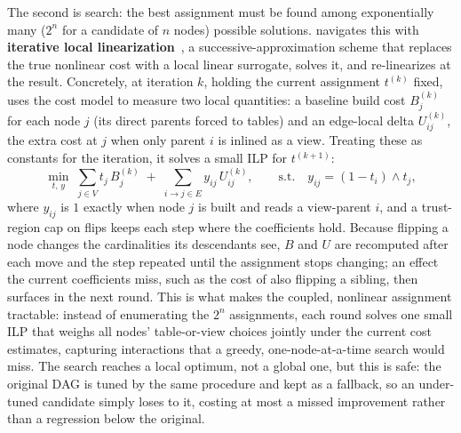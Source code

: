 The second is search: the best assignment must be found among exponentially many ($2^n$ for a candidate of $n$ nodes) possible solutions. \tool{} navigates this with \textbf{iterative local linearization}~\cite{griffith1961slp,palaciosgomez1982slp}, a successive-approximation scheme that replaces the true nonlinear cost with a local linear surrogate, solves it, and re-linearizes at the result. Concretely, at iteration $k$, holding the current assignment $t^{(k)}$ fixed, \tool{} uses the cost model to measure two local quantities: a baseline build cost $B^{(k)}_j$ for each node $j$ (its direct parents forced to tables) and an edge-local delta $U^{(k)}_{ij}$, the extra cost at $j$ when only parent $i$ is inlined as a view. Treating these as constants for the iteration, it solves a small ILP for $t^{(k+1)}$:
\begin{equation*}
\min_{t,\,y}\; \sum_{j \in V} t_j\, B^{(k)}_j \;+\; \sum_{i \to j \in E} y_{ij}\, U^{(k)}_{ij}, \qquad \text{s.t.}\quad y_{ij} = (1 - t_i) \wedge t_j,
\end{equation*}
where $y_{ij}$ is $1$ exactly when node $j$ is built and reads a view-parent $i$, and a trust-region cap on flips keeps each step where the coefficients hold. 
Because flipping a node changes the cardinalities its descendants see, $B$ and $U$ are recomputed after each move and the step repeated until the assignment stops changing; an effect the current coefficients miss, such as the cost of also flipping a sibling, then surfaces in the next round. This is what makes the coupled, nonlinear assignment tractable: instead of enumerating the $2^n$ assignments, each round solves one small ILP that weighs all nodes' table-or-view choices jointly under the current cost estimates, capturing interactions that a greedy, one-node-at-a-time search would miss. The search reaches a local optimum, not a global one, but this is safe: the original DAG is tuned by the same procedure and kept as a fallback, so an under-tuned candidate simply loses to it, costing at most a missed improvement rather than a regression below the original.



